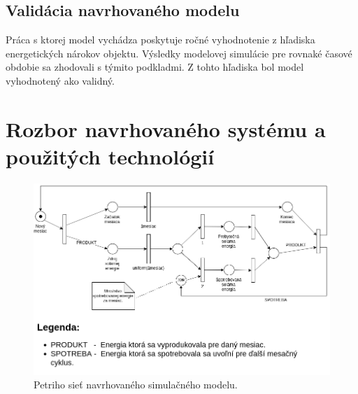 \documentclass[a4paper, 11pt]{article}
\begin{document}
\subsection{Validácia navrhovaného modelu}
Práca s ktorej model vychádza poskytuje ročné vyhodnotenie z hľadiska energetických nárokov objektu. Výsledky modelovej simulácie pre rovnaké časové obdobie sa zhodovali s týmito podkladmi. Z tohto hľadiska bol model vyhodnotený ako validný.


\section{Rozbor navrhovaného systému a použitých technológií}

\begin{figure}[H] 
	\centering
	\includegraphics[width=.8\paperwidth]{petri_net.png}
	\caption{Petriho sieť navrhovaného simulačného modelu.}
	\label{obr1}
\end{figure} \label{obr_petri_net}

\newpage


\end{document}
